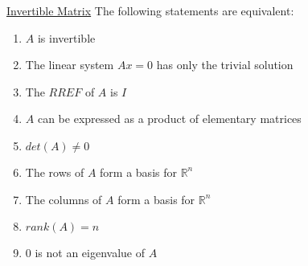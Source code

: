 \documentclass[a4paper,1pt,landscape]{article}
\begin{document}
\begin{multicols}{3}
\underline{Invertible Matrix}
The following statements are equivalent:
\begin{enumerate}
    \item $A$ is invertible
    \item The linear system $Ax = 0$ has only the trivial solution
    \item The $RREF$ of $A$ is $I$
    \item $A$ can be expressed as a product of elementary matrices
    \item $det(A) \neq 0$
    \item The rows of $A$ form a basis for $\mathbb{R}^n$
    \item The columns of $A$ form a basis for $\mathbb{R}^n$
    \item $rank(A) = n$
    \item $0$ is not an eigenvalue of $A$
\end{enumerate}


\end{multicols}
\end{document}
